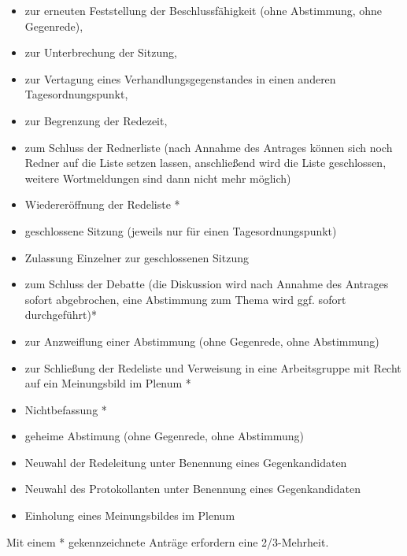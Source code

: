 \documentclass[draft,12pt,oneside]{scrreprt}
\begin{document}
\begin{enumerate}
\begin{itemize}
      \item zur erneuten Feststellung der Beschlussfähigkeit
            (ohne Abstimmung, ohne Gegenrede),

      \item zur Unterbrechung der Sitzung,

      \item zur Vertagung eines Verhandlungsgegenstandes in einen anderen
            Tagesordnungspunkt,

      \item zur Begrenzung der Redezeit,

      \item zum Schluss der Rednerliste (nach Annahme des Antrages können sich
            noch Redner auf die Liste setzen lassen, anschließend wird die Liste
            geschlossen, weitere Wortmeldungen sind dann nicht mehr möglich)

      \item Wiedereröffnung der Redeliste *

      \item geschlossene Sitzung (jeweils nur für einen Tagesordnungspunkt)

      \item Zulassung Einzelner zur geschlossenen Sitzung

      \item zum Schluss der Debatte (die Diskussion wird nach Annahme des
            Antrages sofort abgebrochen, eine Abstimmung zum Thema wird ggf.
            sofort durchgeführt)*

      \item zur Anzweiflung einer Abstimmung (ohne Gegenrede, ohne Abstimmung)

      \item zur Schließung der Redeliste und Verweisung in eine Arbeitsgruppe mit
            Recht auf ein Meinungsbild im Plenum *

      \item Nichtbefassung *

      \item geheime Abstimung (ohne Gegenrede, ohne Abstimmung)

      \item Neuwahl der Redeleitung unter Benennung eines Gegenkandidaten

      \item Neuwahl des Protokollanten unter Benennung eines Gegenkandidaten

      \item Einholung eines Meinungsbildes im Plenum
    \end{itemize}
    Mit einem * gekennzeichnete Anträge erfordern eine 2/3-Mehrheit.
\end{enumerate}
\end{document}
